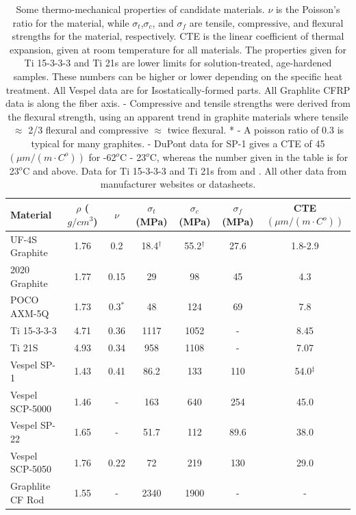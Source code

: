 \documentclass{report}
\begin{document}
\begin{table}[htb]%
\begin{threeparttable}
\begin{tabular}{lcccccc}
\toprule
\textbf{Material} & $\rho$ ($g/cm^3$) & $\nu$ & $\sigma_{t}$ (MPa) & $\sigma_{c}$ (MPa)
& $\sigma_{f}$ (MPa) & CTE $(\mu m/(m\cdot C^o))$ \\
\midrule
 UF-4S Graphite & 1.76  & 0.2 & 18.4$^{\dag}$ & 55.2$^{\dag}$ & 27.6 & 1.8-2.9 \\
 2020 Graphite & 1.77 & 0.15 & 29 & 98 & 45 & 4.3 \\
 POCO AXM-5Q & 1.73 & 0.3$^{*}$ & 48 & 124 & 69 & 7.8 \\
 Ti 15-3-3-3 & 4.71 & 0.36 & 1117 & 1052 & - & 8.45 \\
 Ti 21S & 4.93 & 0.34 & 958 & 1108 & - & 7.07 \\
 Vespel SP-1 & 1.43 & 0.41 & 86.2 & 133 & 110 & 54.0$^{\ddag}$ \\
 Vespel SCP-5000 & 1.46 & - & 163 & 640 & 254 & 45.0 \\
 Vespel SP-22 & 1.65 & - & 51.7 & 112 & 89.6 & 38.0 \\
 Vespel SCP-5050 & 1.76 & 0.22 & 72 & 219 & 130 & 29.0 \\
 Graphlite CF Rod & 1.55 & -  & 2340 & 1900 & - & - \\
 \bottomrule
\end{tabular}
\caption{Some thermo-mechanical properties of candidate materials. $\nu$ is the Poisson's ratio for the material, while $\sigma_{t}$,$\sigma_{c}$, and $\sigma_{f}$ are tensile, compressive, and flexural strengths for the material, respectively. CTE is the linear coefficient of thermal expansion, given at room temperature for all materials. The properties given for Ti 15-3-3-3 and Ti 21s are lower limits for solution-treated, age-hardened samples. These numbers can be higher or lower depending on the specific heat treatment. All Vespel data are for Isostatically-formed parts. All Graphlite CFRP data is along the fiber axis. \dag - Compressive and tensile strengths were derived from the flexural strength, using an apparent trend in graphite materials where tensile $\approx$ 2/3 flexural and compressive $\approx$ twice flexural. * - A poisson ratio of 0.3 is typical for many graphites. \ddag - DuPont data for SP-1 gives a CTE of 45 $(\mu m/(m\cdot C^o))$ for -62$^{o}$C - 23$^{o}$C, whereas the number given in the table is for 23$^{o}$C and above. Data for Ti 15-3-3-3 and Ti 21s from \cite{Nyakana2005} and \cite{Johnson1996}. All other data from manufacturer websites or datasheets.}
\end{threeparttable}
\end{table}
\end{document}
